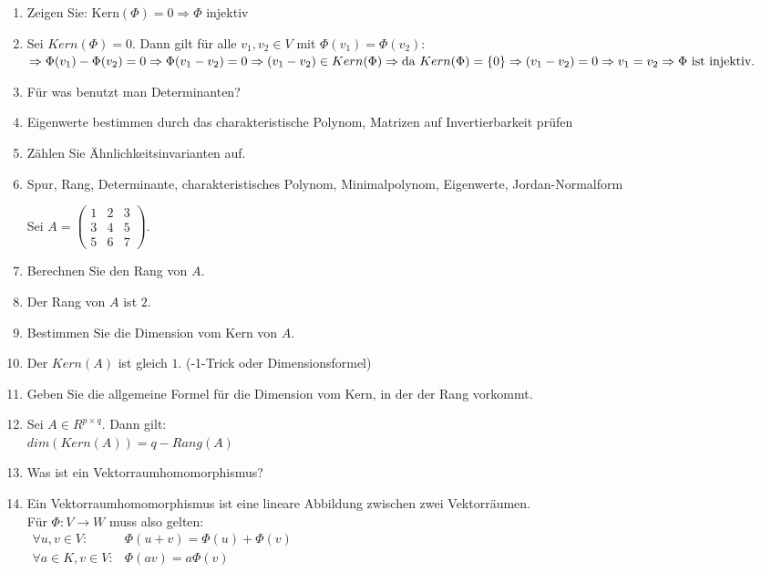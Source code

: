 \documentclass[11pt,parskip=full]{scrartcl}
\newcommand{\answer}{\item[\textbf{Antwort}]}
\begin{document}
\begin{enumerate}[label=\textbf{\arabic*. Frage}]
		\item Zeigen Sie: Kern\((\Phi) = {0} \Rightarrow \Phi\) injektiv
		\answer Sei \(Kern(\Phi) = 0\). Dann gilt für alle \(v_{1}, v_{2} \in V\) mit \(\Phi(v_{1}) = \Phi(v_{2})\):\\
		\(\Rightarrow \Phi(v_{1}) - \Phi(v_{2}) = 0 \\
		\Rightarrow \Phi(v_{1} - v_{2}) = 0 \\
		\Rightarrow (v_{1} - v_{2}) \in Kern(\Phi) \\
		\Rightarrow \text{da } Kern(\Phi) = \{0\} \Rightarrow (v_{1} - v_{2}) = 0 \\
		\Rightarrow v_{1} = v_{2} \Rightarrow \Phi \text{ ist injektiv.}
		\)
		
		\item Für was benutzt man Determinanten?
		\answer Eigenwerte bestimmen durch das charakteristische Polynom, Matrizen auf Invertierbarkeit prüfen
		
		\item Zählen Sie Ähnlichkeitsinvarianten auf.
		\answer Spur, Rang, Determinante, charakteristisches Polynom, Minimalpolynom, Eigenwerte, Jordan-Normalform
		
		Sei \(A =
		\begin{pmatrix}
		1 & 2 & 3 \\
		3 & 4 & 5 \\
		5 & 6 & 7
		\end{pmatrix}\).
		\item Berechnen Sie den Rang von $A$.
		\answer Der Rang von $A$ ist $2$.
		
		\item Bestimmen Sie die Dimension vom Kern von $A$.
		\answer Der \(Kern(A)\) ist gleich $1$. (-1-Trick oder Dimensionsformel)
		
		\item Geben Sie die allgemeine Formel für die Dimension vom Kern, in der der Rang vorkommt.
		\answer Sei \(A \in R^{p \times q}\). Dann gilt:\\
		\(dim(Kern(A)) = q - Rang(A)\)
		
		\item Was ist ein Vektorraumhomomorphismus?
		\answer Ein Vektorraumhomomorphismus ist eine lineare Abbildung zwischen zwei Vektorräumen.\\
		Für \(\Phi: V \rightarrow W\) muss also gelten:\\
		\(\begin{aligned} \forall u, v \in V : & \Phi(u+v)=\Phi(u)+\Phi(v) \\ \forall a \in K, v \in V : & \Phi(a v)=a \Phi(v) \end{aligned}\)
		

\end{enumerate}
\end{document}
